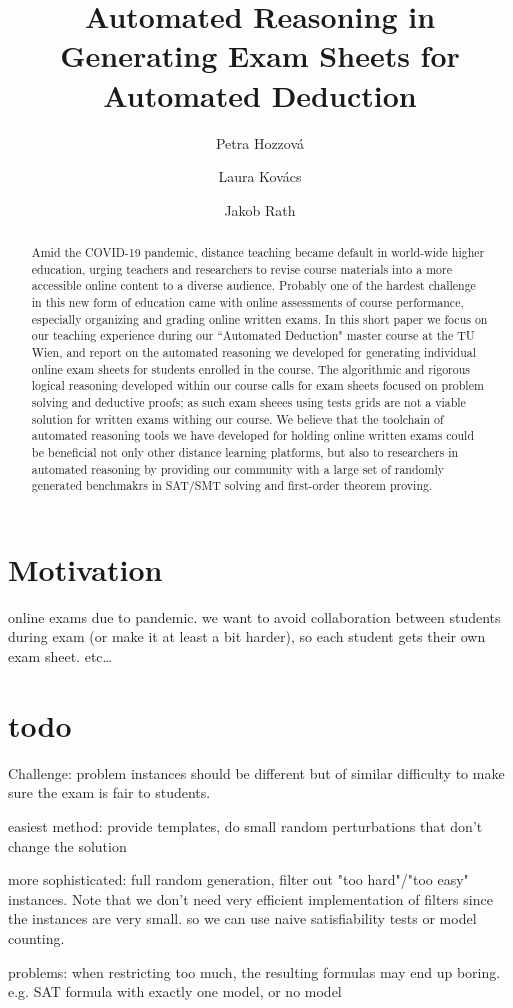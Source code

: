 \documentclass[12pt]{llncs}
\title{Automated Reasoning in Generating Exam Sheets for Automated Deduction
}
\author{Petra Hozzov\'a\and
Laura Kov\'acs \and
Jakob Rath}
\institute{
    TU Wien, Austria
}
\begin{document}
\maketitle





\begin{abstract}
Amid the COVID-19 pandemic, distance teaching became default in world-wide higher education,
urging teachers and researchers to revise course materials into a
more accessible online content to a diverse audience. Probably one of the hardest challenge in this new form of education
came with online assessments of course performance, especially organizing and grading online written exams.
In this short paper we focus on our teaching experience during our ``Automated Deduction" master course at the TU Wien,
and report on the automated reasoning we developed for generating individual online exam sheets for students enrolled in the course.
The algorithmic and rigorous logical reasoning developed within our course calls for exam sheets focused on problem solving and deductive proofs; as such exam sheees using tests grids are not a viable solution for written exams withing our course. We believe that the toolchain of automated reasoning tools we have developed for holding online written exams could be beneficial not only other distance learning platforms, but also to researchers in automated reasoning by providing our community with a large set of randomly generated benchmakrs in SAT/SMT solving and first-order theorem proving.
\end{abstract}





\section{Motivation}

online exams due to pandemic.
we want to avoid collaboration between students during exam (or make it at least a bit harder),
so each student gets their own exam sheet.
etc…


\section{todo}


Challenge:
problem instances should be different but of similar difficulty to make sure the exam is fair to students.

easiest method: provide templates, do small random perturbations that don't change the solution

more sophisticated: full random generation, filter out "too hard"/"too easy" instances.
Note that we don't need very efficient implementation of filters since the instances are very small.
so we can use naive satisfiability tests or model counting.


problems:
when restricting too much, the resulting formulas may end up boring.
e.g. SAT formula with exactly one model, or no model




% 
% 
\end{document}
